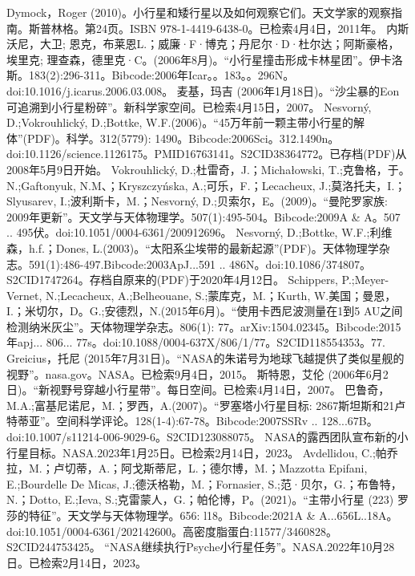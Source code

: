 \begin{enumerate}
 Dymock，Roger (2010)。小行星和矮行星以及如何观察它们。天文学家的观察指南。斯普林格。第24页。ISBN 978-1-4419-6438-0。已检索4月4日，2011年。
 内斯沃尼，大卫; 恩克，布莱恩L.；威廉·F·博克；丹尼尔·D·杜尔达；阿斯豪格，埃里克; 理查森，德里克·C。(2006年8月)。“小行星撞击形成卡林星团”。伊卡洛斯。183(2):296-311。Bibcode:2006年Icar。。183。。296N。doi:10.1016/j.icarus.2006.03.008。
 麦基，玛吉 (2006年1月18日)。“沙尘暴的Eon可追溯到小行星粉碎”。新科学家空间。已检索4月15日，2007。
 Nesvorný, D.;Vokrouhlický, D.;Bottke, W.F.(2006)。“45万年前一颗主带小行星的解体”(PDF)。科学。312(5779): 1490。Bibcode:2006Sci。312.1490n。doi:10.1126/science.1126175。PMID16763141。S2CID38364772。已存档(PDF)从2008年5月9日开始。   
 Vokrouhlický, D.;杜雷奇，J.；Michałowski, T.;克鲁格，于。N.;Gaftonyuk, N.M、；Kryszczyńska, A.;可乐，F.；Lecacheux, J.;莫洛托夫，I.；Slyusarev, I.;波利斯卡，M.；Nesvorný, D.;贝索尔，E。(2009)。“曼陀罗家族: 2009年更新”。天文学与天体物理学。507(1):495-504。Bibcode:2009A & A。507 .. 495伏。doi:10.1051/0004-6361/200912696。
 Nesvorný, D.;Bottke, W.F.;利维森，h.f.；Dones, L.(2003)。“太阳系尘埃带的最新起源”(PDF)。天体物理学杂志。591(1):486-497.Bibcode:2003ApJ...591 .. 486N。doi:10.1086/374807。S2CID1747264。存档自原来的(PDF)于2020年4月12日。  
 Schippers, P.;Meyer-Vernet, N.;Lecacheux, A.;Belheouane, S.;蒙库克，M.；Kurth, W.美国；曼恩，I.；米切尔，D。G.;安德烈，N.(2015年6月)。“使用卡西尼波测量在1到5 AU之间检测纳米灰尘”。天体物理学杂志。806(1): 77。arXiv:1504.02345。Bibcode:2015年apj... 806... 77s。doi:10.1088/0004-637X/806/1/77。S2CID118554353。77. 
 Greicius，托尼 (2015年7月31日)。“NASA的朱诺号为地球飞越提供了类似星舰的视野”。nasa.gov。NASA。已检索9月4日，2015。
 斯特恩，艾伦 (2006年6月2日)。“新视野号穿越小行星带”。每日空间。已检索4月14日，2007。
 巴鲁奇，M.A.;富基尼诺尼，M.；罗西，A.(2007)。“罗塞塔小行星目标: 2867斯坦斯和21卢特蒂亚”。空间科学评论。128(1-4):67-78。Bibcode:2007SSRv .. 128...67B。doi:10.1007/s11214-006-9029-6。S2CID123088075。 
 NASA的露西团队宣布新的小行星目标。NASA.2023年1月25日。已检索2月14日，2023。
 Avdellidou, C.;帕乔拉，M.；卢切蒂，A.；阿戈斯蒂尼，L.；德尔博，M.；Mazzotta Epifani, E.;Bourdelle De Micas, J.;德沃格勒，M.；Fornasier, S.;范·贝尔，G.；布鲁特，N.；Dotto, E.;Ieva, S.;克雷蒙人，G.；帕伦博，P。(2021)。“主带小行星 (223) 罗莎的特征”。天文学与天体物理学。656: l18。Bibcode:2021A & A...656L..18A。doi:10.1051/0004-6361/202142600。高密度脂蛋白:11577/3460828。S2CID244753425。 
 “NASA继续执行Psyche小行星任务”。NASA.2022年10月28日。已检索2月14日，2023。
 \end{enumerate}